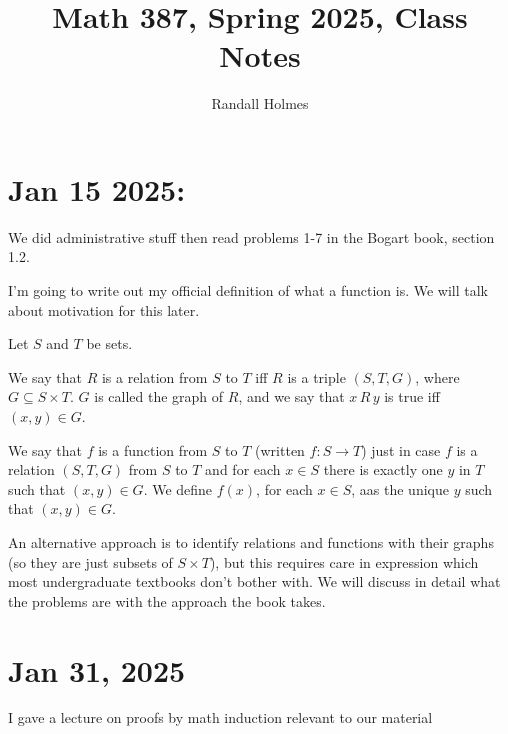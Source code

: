 \documentclass[12pt]{article}
\title{Math 387, Spring 2025, Class Notes}
\author{Randall Holmes}
\begin{document}
\maketitle

\tableofcontents

\newpage

\section{Jan 15 2025:}  We did administrative stuff then read problems 1-7 in the Bogart book, section 1.2.

I'm going to write out my official definition of what a function is.  We will talk about motivation for this later.

Let $S$ and $T$ be sets.

We say that $R$ is a relation from $S$ to $T$ iff $R$ is a triple $(S,T,G)$, where $G \subseteq S \times T$.  $G$ is called the graph of $R$, and we say that $x \, R \, y$ is true iff $(x,y) \in G$.

We say that $f$ is a function from $S$ to $T$ (written $f:S \rightarrow T$) just in case $f$ is a relation $(S,T,G)$ from
$S$ to $T$ and for each $x \in S$ there is exactly one $y$ in $T$ such that $(x,y) \in G$.  We define $f(x)$, for each $x \in S$, aas the unique $y$ such that $(x,y) \in G$.

An alternative approach is to identify relations and functions with their graphs (so they are just subsets of $S \times T$), but this requires care in expression which most undergraduate textbooks don't bother with.  We will discuss in detail what the problems are with the approach the book takes.

\section{Jan 31, 2025}

I gave a lecture on proofs by math induction relevant to our material
\end{document}
